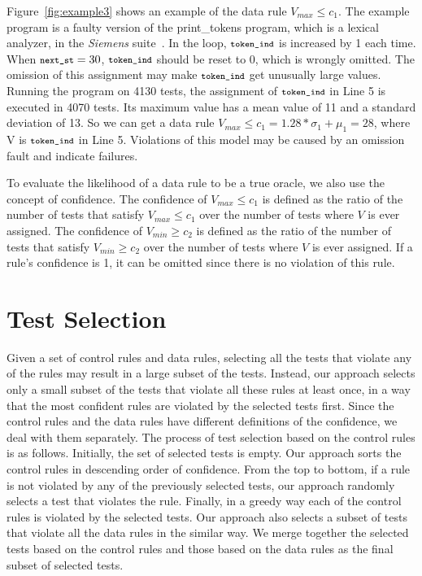 \documentclass{sig-alternate}
\newcommand{\CodeIn}[1]{{\small\texttt{#1}}}
\begin{document}
Figure~\ref{fig:example3} shows an example of the data rule
$V_{max}\le c_1$. The example program is a faulty version of the
print\_tokens program, which is a lexical analyzer, in the
\emph{Siemens} suite~\cite{Hutchins94}. In the loop,
$\CodeIn{token\_ind}$ is increased by 1 each time. When
$\CodeIn{next\_st}=30$, $\CodeIn{token\_ind}$ should be reset to 0,
which is wrongly omitted. The omission of this assignment may make
$\CodeIn{token\_ind}$ get unusually large values. Running the
program on 4130 tests, the assignment of $\CodeIn{token\_ind}$ in
Line 5 is executed in 4070 tests. Its maximum value has a mean value
of 11 and a standard deviation of 13. So we can get a data rule
$V_{max}\le c_1=1.28*\sigma_1+\mu_1=28$, where V is
$\CodeIn{token\_ind}$ in Line 5. Violations of this model may be
caused by an omission fault and indicate failures.



To evaluate the likelihood of a data rule to be a true oracle, we
also use the concept of confidence. The confidence of $V_{max}\le
c_1$ is defined as the ratio of the number of tests that satisfy
$V_{max}\le c_1$ over the number of tests where $V$ is ever
assigned. The confidence of $V_{min}\ge c_2$ is defined as the ratio
of the number of tests that satisfy $V_{min}\ge c_2$ over the number
of tests where $V$ is ever assigned. If a rule's confidence is 1, it
can be omitted since there is no violation of this rule.




\section{Test Selection} \label{sec:select}

Given a set of control rules and data rules, selecting all the tests
that violate any of the rules may result in a large subset of the
tests. Instead, our approach selects only a small subset of the
tests that violate all these rules at least once, in a way that the
most confident rules are violated by the selected tests first. Since
the control rules and the data rules have different definitions of
the confidence, we deal with them separately. The process of test
selection based on the control rules is as follows. Initially, the
set of selected tests is empty. Our approach sorts the control rules
in descending order of confidence. From the top to bottom, if a rule
is not violated by any of the previously selected tests, our
approach randomly selects a test that violates the rule. Finally, in
a greedy way each of the control rules is violated by the selected
tests. Our approach also selects a subset of tests that violate all
the data rules in the similar way. We merge together the selected
tests based on the control rules and those based on the data rules
as the final subset of selected tests.
\end{document}
